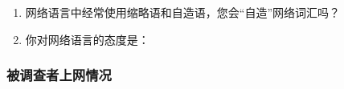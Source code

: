 \begin{enumerate}
\begin{enumerate*}
  \end{enumerate*}
\item 网络语言中经常使用缩略语和自造语，您会“自造”网络词汇吗？
  \\
\item 你对网络语言的态度是：
  \\
\end{enumerate}

\subsubsection{被调查者上网情况}

